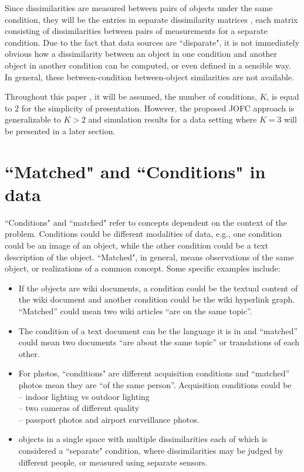 \documentclass[11pt]{article} %
\begin{document}
 Since dissimilarities are  measured between pairs of objects under the same condition, they will be the entries in  
 separate dissimilarity matrices , each matrix consisting of dissimilarities between pairs of  measurements for a separate condition.
 Due to the fact that data sources are ``disparate", it is not immediately obvious how  a dissimilarity between an object in one condition and another object in another condition  can be computed, or even defined in a sensible way.  In general, these between-condition between-object  similarities are not available. 

Throughout this paper , it will be assumed,  the number of conditions, $K$, is equal to $2$ for the  simplicity of presentation. 
However, the proposed JOFC approach is  generalizable  to $K>2$ and  simulation results for a data setting where $K=3$ will be presented in a later section.

\section{``Matched" and ``Conditions" in data}

 ``Conditions" and ``matched" refer to concepts dependent on the context of the  problem. Conditions could be different modalities of data, e.g., one condition could be  an image of an object, while the other condition could be a text description of the object. ``Matched", in general, means observations of the same object, or realizations of a common concept. Some specific examples include:

  \begin{itemize}
    \item
If the objects are wiki documents, a condition could be the textual content of the wiki document and another condition could be the wiki hyperlink graph. ``Matched'' could mean two  wiki articles ``are on the same topic''.
\item
The condition of a text document can be the language it is in and ``matched'' could mean two documents ``are about the same topic'' or translations of each other.

    \item For photos, ``conditions" are different acquisition conditions and ``matched'' photos mean they are  ``of the same person''. Acquisition conditions could be\\
    \hspace*{0.1 in}-- indoor lighting vs outdoor lighting\\
    \hspace*{0.1 in}-- two cameras of different quality\\
    \hspace*{0.1 in}-- passport photos and airport surveillance photos.
    \item   objects in a single space with multiple dissimilarities each of which is considered a ``separate" condition, where dissimilarities may be judged by different people, or measured using separate sensors.
  \end{itemize}
\end{document}
